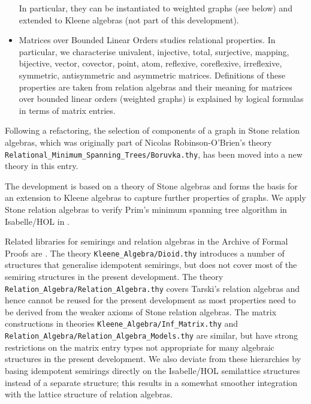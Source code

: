 \documentclass[11pt,a4paper]{article}
\begin{document}
\begin{itemize}
      In particular, they can be instantiated to weighted graphs (see below) and extended to Kleene algebras (not part of this development).
\item Matrices over Bounded Linear Orders studies relational properties.
      In particular, we characterise univalent, injective, total, surjective, mapping, bijective, vector, covector, point, atom, reflexive, coreflexive, irreflexive, symmetric, antisymmetric and asymmetric matrices.
      Definitions of these properties are taken from relation algebras and their meaning for matrices over bounded linear orders (weighted graphs) is explained by logical formulas in terms of matrix entries.
\end{itemize}
Following a refactoring, the selection of components of a graph in Stone relation algebras, which was originally part of Nicolas Robinson-O'Brien's theory \texttt{Relational\_Minimum\_Spanning\_Trees/Boruvka.thy}, has been moved into a new theory in this entry.

The development is based on a theory of Stone algebras \cite{Guttmann2016b} and forms the basis for an extension to Kleene algebras to capture further properties of graphs.
We apply Stone relation algebras to verify Prim's minimum spanning tree algorithm in Isabelle/HOL in \cite{Guttmann2016c}.

Related libraries for semirings and relation algebras in the Archive of Formal Proofs are \cite{ArmstrongFosterStruthWeber2016,ArmstrongGomesStruthWeber2016}.
The theory \texttt{Kleene\_Algebra/Dioid.thy} introduces a number of structures that generalise idempotent semirings, but does not cover most of the semiring structures in the present development.
The theory \texttt{Relation\_Algebra/Relation\_Algebra.thy} covers Tarski's relation algebras and hence cannot be reused for the present development as most properties need to be derived from the weaker axioms of Stone relation algebras.
The matrix constructions in theories \texttt{Kleene\_Algebra/Inf\_Matrix.thy} and \texttt{Relation\_Algebra/Relation\_Algebra\_Models.thy} are similar, but have strong restrictions on the matrix entry types not appropriate for many algebraic structures in the present development.
We also deviate from these hierarchies by basing idempotent semirings directly on the Isabelle/HOL semilattice structures instead of a separate structure; this results in a somewhat smoother integration with the lattice structure of relation algebras.

\begin{flushleft}

\end{flushleft}



\end{document}
